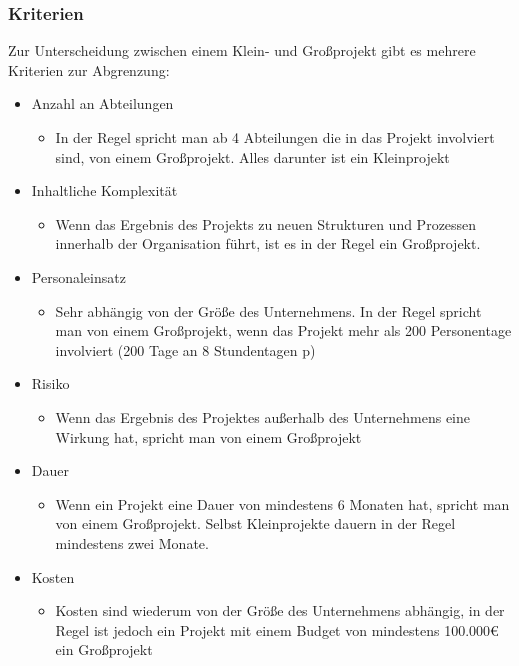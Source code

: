 \documentclass{article}
\begin{document}
	\subsubsection{Kriterien}
	Zur Unterscheidung zwischen einem Klein- und Großprojekt gibt es mehrere Kriterien zur Abgrenzung:
	\begin{itemize}
		\item{Anzahl an Abteilungen}
		\begin{itemize}
			\item{In der Regel spricht man ab 4 Abteilungen die in das Projekt involviert sind, von einem Großprojekt. Alles darunter ist ein Kleinprojekt}
		\end{itemize}
		\item{Inhaltliche Komplexität}
		\begin{itemize}
			\item{Wenn das Ergebnis des Projekts zu neuen Strukturen und Prozessen innerhalb der Organisation führt, ist es in der Regel ein Großprojekt.}
		\end{itemize}
		\item{Personaleinsatz}
		\begin{itemize}
			\item{Sehr abhängig von der Größe des Unternehmens. In der Regel spricht man von einem Großprojekt, wenn das Projekt mehr als 200 Personentage involviert (200 Tage an 8 Stundentagen p)}
		\end{itemize}
		\item{Risiko}
		\begin{itemize}
			\item{Wenn das Ergebnis des Projektes außerhalb des Unternehmens eine Wirkung hat, spricht man von einem Großprojekt}
		\end{itemize}
		\item{Dauer}
		\begin{itemize}
			\item{Wenn ein Projekt eine Dauer von mindestens 6 Monaten hat, spricht man von einem Großprojekt. Selbst Kleinprojekte dauern in der Regel mindestens zwei Monate.}
		\end{itemize}
		\item{Kosten}
		\begin{itemize}
			\item{Kosten sind wiederum von der Größe des Unternehmens abhängig, in der Regel ist jedoch ein Projekt mit einem Budget von mindestens 100.000€ ein Großprojekt}
		\end{itemize}
	\end{itemize}
\end{document}
